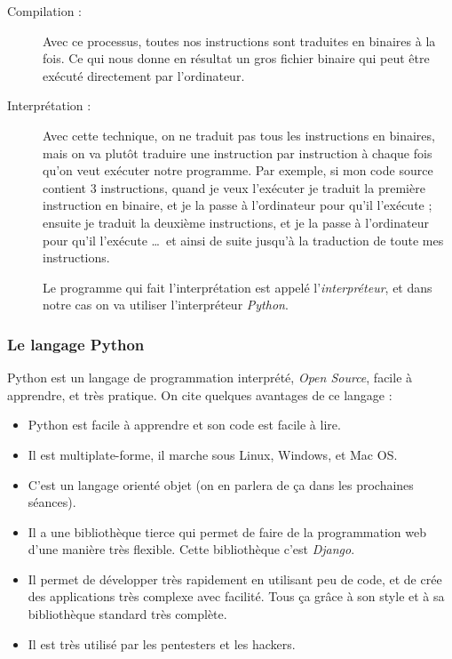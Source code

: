 \documentclass[12pt]{article}
\begin{document}
            \begin{description}
                \item[Compilation :] Avec ce processus, toutes nos instructions sont traduites en binaires à la fois.
                    Ce qui nous donne en résultat un gros fichier binaire qui peut être exécuté directement par
                    l'ordinateur.
                \item[Interprétation :] Avec cette technique, on ne traduit pas tous les instructions en binaires, mais
                    on va plutôt traduire une instruction par instruction à chaque fois qu'on veut exécuter
                    notre programme. Par exemple, si mon code source contient 3 instructions, quand je veux l'exécuter je
                    traduit la première instruction en binaire, et je la passe à l'ordinateur pour qu'il l'exécute ;
                    ensuite je traduit la deuxième instructions, et je la passe à l'ordinateur pour qu'il l'exécute
                    \ldots\ et ainsi de suite jusqu'à la traduction de toute
                    mes instructions.

                    Le programme qui fait l'interprétation est appelé l'\emph{interpréteur}, et dans notre cas on va utiliser
                    l'interpréteur \emph{Python}.
            \end{description}

        \subsubsection{Le langage Python}
            Python est un langage de programmation interprété, \emph{Open Source}, facile à apprendre,
            et très pratique. On cite quelques avantages de ce langage :
            \begin{itemize}
                \item Python est facile à apprendre et son code est facile à lire.
                \item Il est multiplate-forme, il marche sous Linux, Windows, et Mac OS.
                \item C'est un langage orienté objet (on en parlera de ça dans les prochaines séances).
                \item Il a une bibliothèque tierce qui permet de faire de la programmation web d'une manière très flexible.
                    Cette bibliothèque c'est \emph{Django}.
                \item Il permet de développer très rapidement en utilisant peu de code, et de crée des applications
                    très complexe avec facilité. Tous ça grâce à son style et à sa bibliothèque standard très complète.
                \item Il est très utilisé par les pentesters et les hackers.
            \end{itemize}
\end{document}
